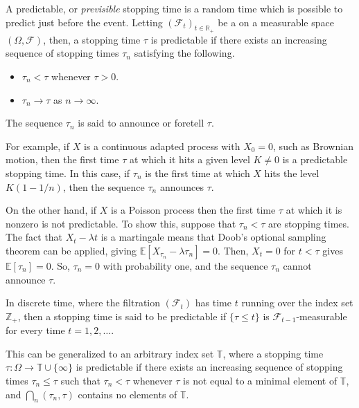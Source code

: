 \documentclass[12pt]{article}
\begin{document}
A predictable, or \emph{previsible} stopping time is a random time which is possible to predict just before the event.
Letting  $(\mathcal{F}_t)_{t\in\mathbb{R}_+}$ be a  on a measurable space $(\Omega,\mathcal{F})$, then, a stopping time $\tau$ is predictable if there exists an increasing sequence of stopping times $\tau_n$ satisfying the following.
\begin{itemize}
\item $\tau_n<\tau$ whenever $\tau>0$.
\item $\tau_n\rightarrow\tau$ as $n\rightarrow\infty$.
\end{itemize}
The sequence $\tau_n$ is said to announce or foretell $\tau$.

For example, if $X$ is a continuous adapted process with $X_0=0$, such as Brownian motion, then the first time $\tau$ at which it hits a given level $K\not=0$ is a predictable stopping time.
In this case, if $\tau_n$ is the first time at which $X$ hits the level $K(1-1/n)$, then the sequence $\tau_n$ announces $\tau$.

On the other hand, if $X$ is a Poisson process then the first time $\tau$ at which it is nonzero is not predictable. To show this, suppose that $\tau_n<\tau$ are stopping times. The fact that $X_t-\lambda t$ is a martingale means that Doob's optional sampling theorem can be applied, giving $\mathbb{E}[X_{\tau_n}-\lambda\tau_n]=0$.
Then, $X_t=0$ for $t<\tau$ gives $\mathbb{E}[\tau_n]=0$. So, $\tau_n=0$ with probability one, and the sequence $\tau_n$ cannot announce $\tau$.


In discrete time, where the filtration $(\mathcal{F}_t)$ has time $t$ running over the index set $\mathbb{Z}_+$, then a stopping time is said to be predictable if $\{\tau\le t\}$ is $\mathcal{F}_{t-1}$-measurable for every time $t=1,2,\ldots$.

This can be generalized to an arbitrary index set $\mathbb{T}$, where a stopping time $\tau\colon\Omega\rightarrow\mathbb{T}\cup\{\infty\}$ is predictable if there exists an increasing sequence of stopping times $\tau_n\le\tau$ such that $\tau_n<\tau$ whenever $\tau$ is not equal to a minimal element of $\mathbb{T}$, and $\bigcap_n(\tau_n,\tau)$ contains no elements of $\mathbb{T}$.

\end{document}
